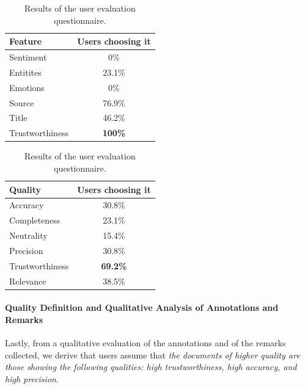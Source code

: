 \documentclass{llncs}
\begin{document}
\begin{table}
\centering
\caption{Results of the user evaluation questionnaire.\label{tab:questj}}
\begin{tabular}{| l | c |}
\hline
{\bf Feature} & {\bf Users choosing it} \\ \hline
Sentiment & 0\% \\ \hline
Entitites & 23.1\% \\ \hline
Emotions & 0\% \\ \hline
Source & 76.9\% \\ \hline
Title & 46.2\% \\ \hline
Trustworthiness & {\bf 100\%} \\ \hline
\end{tabular}
\begin{tabular}{| l | c |}
\hline
{\bf Quality} & {\bf  Users choosing it} \\ \hline
Accuracy & 30.8\% \\ \hline
Completeness & 23.1\% \\ \hline
Neutrality & 15.4\% \\ \hline
Precision & 30.8\% \\ \hline
Trustworthiness & {\bf 69.2\%} \\ \hline
Relevance & 38.5\% \\ \hline
\end{tabular}

\end{table}

\paragraph{Quality Definition and Qualitative Analysis of Annotations and Remarks}
Lastly, from a qualitative evaluation of the annotations and of the remarks collected, we derive that users assume that \emph{the documents of higher quality are those showing the following qualities: high trustworthiness, high accuracy, and high precision}.
\end{document}
